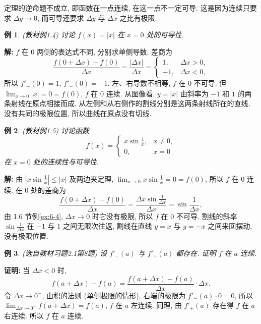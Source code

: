 \documentclass[UTF8,openany]{ctexbook}
\theoremstyle{chinesetextbook}
\newtheorem{example}{例}[section]
\newenvironment{cnproof}{\par\indent\textbf{证明:} \ignorespaces}{\par}
\newenvironment{cnsolution}{\par\indent\textbf{解:} \ignorespaces}{\par}
\begin{document}
定理的逆命题不成立, 即函数在一点连续, 在这一点不一定可导. 这是因为连续只要求 $\Delta y\to0$, 而可导还要求 $\Delta y$ 与 $\Delta x$ 之比有极限.
\begin{example}\label{ex:c2-1-4}
\textnormal{(教材例1.4)} 讨论 $f(x)=|x|$ 在 $x=0$ 处的可导性.
\end{example}
\begin{cnsolution}
$f$ 在 $0$ 两侧的表达式不同, 分别求单侧导数. 差商为
\[
\frac{f(0+\Delta x)-f(0)}{\Delta x}=\frac{|\Delta x|}{\Delta x}=\begin{cases}1,&\Delta x>0,\\-1,&\Delta x<0,\end{cases}
\]
所以 $f'_+(0)=1$, $f'_-(0)=-1$. 左、右导数不相等, $f$ 在 $0$ 不可导. 但 $\displaystyle\lim_{x\to0}|x|=0=f(0)$, $f$ 在 $0$ 连续. 从图像看, $y=|x|$ 由斜率为 $-1$ 和 $1$ 的两条射线在原点相接而成. 从左侧和从右侧作的割线分别是这两条射线所在的直线, 没有共同的极限位置, 所以曲线在原点没有切线.
\end{cnsolution}
\begin{example}\label{ex:c2-1-5}
\textnormal{(教材例1.5)} 讨论函数
\[
f(x)=\begin{cases}x\sin\frac1x,&x\ne0,\\0,&x=0\end{cases}
\]
在 $x=0$ 处的连续性与可导性.
\end{example}
\begin{cnsolution}
由 $\displaystyle\left|x\sin\frac1x\right|\le|x|$ 及两边夹定理, $\displaystyle\lim_{x\to0}x\sin\frac1x=0=f(0)$, 所以 $f$ 在 $0$ 连续. 在 $0$ 处的差商为
\[
\frac{f(0+\Delta x)-f(0)}{\Delta x}=\frac{\Delta x\sin\frac1{\Delta x}}{\Delta x}=\sin\frac1{\Delta x},
\]
由 1.6 节例\ref{ex:6-4}, $\Delta x\to0$ 时它没有极限, 所以 $f$ 在 $0$ 不可导. 割线的斜率 $\displaystyle\sin\frac1{\Delta x}$ 在 $-1$ 与 $1$ 之间无限次往返, 割线在直线 $y=x$ 与 $y=-x$ 之间来回摆动, 没有极限位置.
\end{cnsolution}
\begin{example}\label{ex:c2-h1-8}
\textnormal{(选自教材习题2.1第8题)} 设 $f'_-(a)$ 与 $f'_+(a)$ 都存在. 证明 $f$ 在 $a$ 连续.
\end{example}
\begin{cnproof}
当 $\Delta x<0$ 时,
\[
f(a+\Delta x)-f(a)=\frac{f(a+\Delta x)-f(a)}{\Delta x}\cdot\Delta x.
\]
令 $\Delta x\to0^-$, 由积的法则 (单侧极限的情形), 右端的极限为 $f'_-(a)\cdot0=0$, 所以 $\displaystyle\lim_{\Delta x\to0^-}f(a+\Delta x)=f(a)$, $f$ 在 $a$ 左连续. 同理, 由 $f'_+(a)$ 存在得 $f$ 在 $a$ 右连续. 所以 $f$ 在 $a$ 连续.
\end{cnproof}
\end{document}
